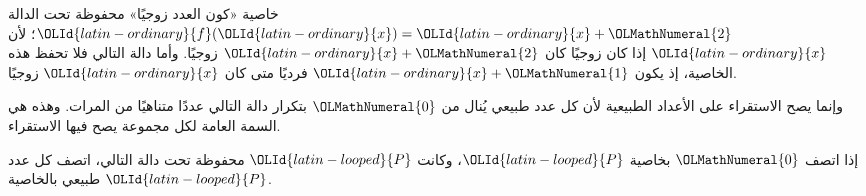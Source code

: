 \documentclass[../../../include/open-logic-section]{subfiles}
\begin{document}
\begin{explain}
خاصية «كون العدد زوجيًا» محفوظة تحت الدالة ${\OLId{latin-ordinary}{f}}({\OLId{latin-ordinary}{x}}) = {\OLId{latin-ordinary}{x}}+{\OLMathNumeral{2}}$؛ لأن
${\OLId{latin-ordinary}{x}}$ إذا كان زوجيًا كان ${\OLId{latin-ordinary}{x}}+{\OLMathNumeral{2}}$ زوجيًا. وأما دالة التالي فلا تحفظ هذه
الخاصية، إذ يكون ${\OLId{latin-ordinary}{x}}+{\OLMathNumeral{1}}$ فرديًا متى كان ${\OLId{latin-ordinary}{x}}$ زوجيًا.

وإنما يصح الاستقراء على الأعداد الطبيعية لأن كل عدد طبيعي يُنال من
${\OLMathNumeral{0}}$ بتكرار دالة التالي عددًا متناهيًا من المرات. وهذه هي السمة العامة
لكل مجموعة يصح فيها الاستقراء.
\end{explain}

\begin{defn}
إذا اتصف ${\OLMathNumeral{0}}$ بخاصية ${\OLId{latin-looped}{P}}$، وكانت ${\OLId{latin-looped}{P}}$ محفوظة تحت دالة التالي، اتصف كل
عدد طبيعي بالخاصية ${\OLId{latin-looped}{P}}$.
\end{defn}
\end{document}
